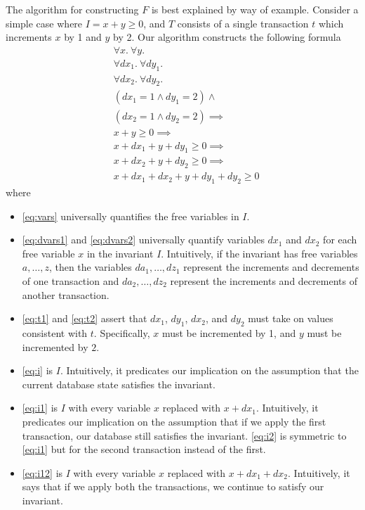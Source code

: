 The algorithm for constructing $F$ is best explained by way of example.
Consider a simple case where $I = x + y \geq 0$, and $T$ consists of a single
transaction $t$ which increments $x$ by 1 and $y$ by 2. Our algorithm
constructs the following formula
\begin{align}
  & \forall x.\> \forall y.\>                \label{eq:vars} \\
  & \forall dx_1.\> \forall dy_1.\>          \label{eq:dvars1} \\
  & \forall dx_2.\> \forall dy_2.\>          \label{eq:dvars2} \\
  & (dx_1 = 1 \land dy_1 = 2) \land {}       \label{eq:t1} \\
  & (dx_2 = 1 \land dy_2 = 2) \implies {}    \label{eq:t2} \\
  & x + y \geq 0 \implies {}                 \label{eq:i} \\
  & x + dx_1 + y + dy_1 \geq 0 \implies {}   \label{eq:i1} \\
  & x + dx_2 + y + dy_2 \geq 0 \implies {}   \label{eq:i2} \\
  & x + dx_1 + dx_2 + y + dy_1 + dy_2 \geq 0 \label{eq:i12}
\end{align}
where
\begin{itemize}
  \item
    \eqref{eq:vars} universally quantifies the free variables in $I$.

  \item
    \eqref{eq:dvars1} and \eqref{eq:dvars2} universally quantify variables
    $dx_1$ and $dx_2$ for each free variable $x$ in the invariant $I$.
    Intuitively, if the invariant has free variables $a, \ldots, z$, then the
    variables $da_1, \ldots, dz_1$ represent the increments and decrements of
    one transaction and $da_2, \ldots, dz_2$ represent the increments and
    decrements of another transaction.

  \item
    \eqref{eq:t1} and \eqref{eq:t2} assert that $dx_1$, $dy_1$, $dx_2$, and
    $dy_2$ must take on values consistent with $t$. Specifically, $x$ must be
    incremented by 1, and $y$ must be incremented by $2$.

  \item
    \eqref{eq:i} is $I$. Intuitively, it predicates our implication on the
    assumption that the current database state satisfies the invariant.

  \item
    \eqref{eq:i1} is $I$ with every variable $x$ replaced with $x + dx_1$.
    Intuitively, it predicates our implication on the assumption that if we
    apply the first transaction, our database still satisfies the invariant.
    \eqref{eq:i2} is symmetric to \eqref{eq:i1} but for the second transaction
    instead of the first.

  \item
    \eqref{eq:i12} is $I$ with every variable $x$ replaced with $x + dx_1 +
    dx_2$. Intuitively, it says that if we apply both the transactions, we
    continue to satisfy our invariant.
\end{itemize}

